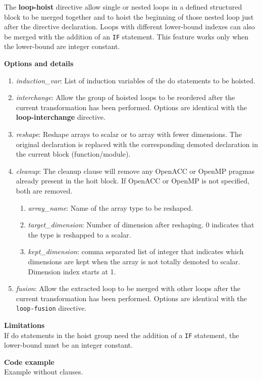 The \textbf{loop-hoist} directive allow single or nested loops in a defined
structured block to be merged together and to hoist the beginning of those
nested loop just after the directive declaration. Loops with different
lower-bound indexes can also be merged with the addition of an \lstinline!IF!
statement. This feature works only when the lower-bound are integer constant.


\textbf{Options and details}
\begin{enumerate}
\item \textit{induction\_var}: List of induction variables of the do statements
to be hoisted.
\item \textit{interchange}: Allow the group of hoisted loops to be reordered
after the current transformation has been performed.
Options are identical with the \textbf{loop-interchange} directive.
\item \textit{reshape}: Reshape arrays to scalar or to array with fewer
dimensions. The original declaration is replaced with the corresponding demoted
declaration in the current block (function/module).
\item \textit{cleanup}: The cleanup clause will remove any OpenACC or OpenMP pragmas
already present in the hoit block. If OpenACC or OpenMP is not specified, both are
removed.

\begin{enumerate}
  \item \textit{array\_name}: Name of the array type to be reshaped.
  \item \textit{target\_dimension}: Number of dimension after reshaping. 0
  indicates that the type is reshapped to a scalar.
  \item \textit{kept\_dimension}: comma separated list of integer that indicates
  which dimensions are kept when the array is not totally demoted to scalar.
  Dimension index starts at 1.
\end{enumerate}
\item \textit{fusion}: Allow the extracted loop to be merged with other loops
after the current transformation has been performed.
Options are identical with the \lstinline!loop-fusion! directive.
\end{enumerate}

\textbf{Limitations}\\
If do statements in the hoist group need the addition of a \lstinline|IF|
statement, the lower-bound must be an integer constant.

\textbf{Code example}\\
\label{loop-hoist1}
Example without clauses.

